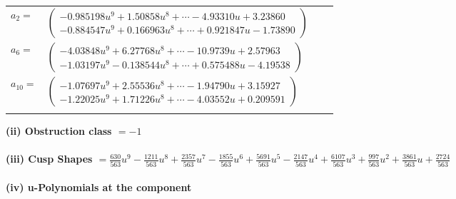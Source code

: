 \documentclass[1p]{elsarticle_modified}
\theoremstyle{definition}
\begin{document}
\begin{tabular}{m{7pt} m{180pt} m{7pt} m{180pt} }
\flushright $a_{2}=$&$\begin{pmatrix}-0.985198 u^{9}+1.50858 u^{8}+\cdots-4.93310 u+3.23860\\-0.884547 u^{9}+0.166963 u^{8}+\cdots+0.921847 u-1.73890\end{pmatrix}$ \\
\flushright $a_{6}=$&$\begin{pmatrix}-4.03848 u^{9}+6.27768 u^{8}+\cdots-10.9739 u+2.57963\\-1.03197 u^{9}-0.138544 u^{8}+\cdots+0.575488 u-4.19538\end{pmatrix}$ \\
\flushright $a_{10}=$&$\begin{pmatrix}-1.07697 u^{9}+2.55536 u^{8}+\cdots-1.94790 u+3.15927\\-1.22025 u^{9}+1.71226 u^{8}+\cdots-4.03552 u+0.209591\end{pmatrix}$\\&\end{tabular}
\flushleft \textbf{(ii) Obstruction class $= -1$}\\~\\
\flushleft \textbf{(iii) Cusp Shapes $= \frac{630}{563} u^9-\frac{1211}{563} u^8+\frac{2357}{563} u^7-\frac{1855}{563} u^6+\frac{5691}{563} u^5-\frac{2147}{563} u^4+\frac{6107}{563} u^3+\frac{997}{563} u^2+\frac{3861}{563} u+\frac{2724}{563}$}\\~\\
\newpage\renewcommand{\arraystretch}{1}
\flushleft \textbf{(iv) u-Polynomials at the component}\newline \\
\end{document}

